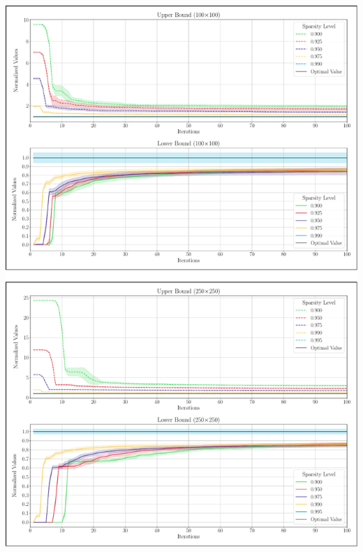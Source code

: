 \clearpage
\begin{center}
    \includegraphics[width=412pt]{assets/figures/size_lineplot2.pdf}
\end{center}

